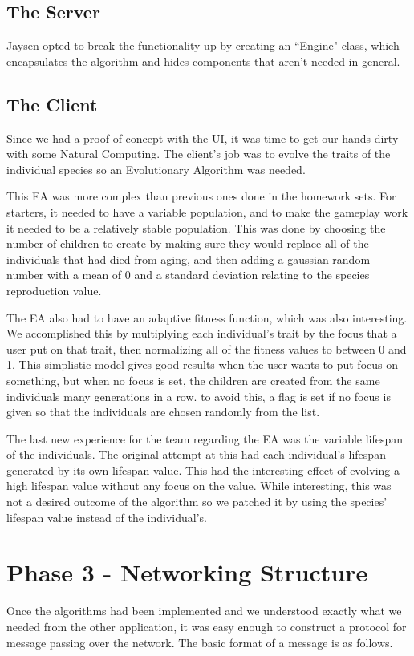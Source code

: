 \subsection{The Server}
Jaysen opted to break the functionality up by creating an ``Engine" class, which
encapsulates the algorithm and hides components that aren't needed in general.

\subsection{The Client}
Since we had a proof of concept with the UI, it was time to get our hands dirty with some Natural Computing. The client's job was to evolve the traits of the individual species so an Evolutionary Algorithm was needed.

This EA was more complex than previous ones done in the homework sets. For starters, it needed to have a variable population, and to make the gameplay work it needed to be a relatively stable population. This was done by choosing the number of children to create by making sure they would replace all of the individuals that had died from aging, and then adding a gaussian random number with a mean of 0 and a standard deviation relating to the species reproduction value.

The EA also had to have an adaptive fitness function, which was also interesting. We accomplished this by multiplying each individual's trait by the focus that a user put on that trait, then normalizing all of the fitness values to between 0 and 1. This simplistic model gives good results when the user wants to put focus on something, but when no focus is set, the children are created from the same individuals many generations in a row. to avoid this, a flag is set if no focus is given so that the individuals are chosen randomly from the list.

The last new experience for the team regarding the EA was the variable lifespan of the individuals. The original attempt at this had each individual's lifespan generated by its own lifespan value. This had the interesting effect of evolving a high lifespan value without any focus on the value. While interesting, this was not a desired outcome of the algorithm so we patched it by using the species' lifespan value instead of the individual's.

\section{Phase 3 - Networking Structure}
Once the algorithms had been implemented and we understood exactly what we needed
from the other application, it was easy enough to construct a protocol for message
passing over the network. The basic format of a message is as follows.

